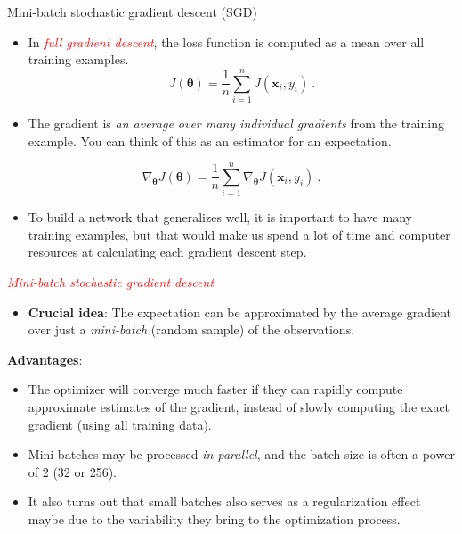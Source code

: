 \documentclass[10pt,ignorenonframetext,]{beamer}
\providecommand{\tightlist}{%
  \setlength{\itemsep}{0pt}\setlength{\parskip}{0pt}}
\begin{document}
\begin{frame}

\begin{block}{Mini-batch stochastic gradient descent (SGD)}

\vspace{2mm}

\begin{itemize}
\item
  In \emph{\textcolor{red}{full gradient descent}}, the loss function is
  computed as a mean over all training examples. \[
  J({\boldsymbol \theta})=\frac{1}{n}\sum_{i=1}^n J({\boldsymbol x}_i, y_i) \ .
  \]
\item
  The gradient is \emph{an average over many individual gradients} from
  the training example. You can think of this as an estimator for an
  expectation.
\end{itemize}

\[
\nabla_{\boldsymbol \theta} J({\boldsymbol \theta})=\frac{1}{n}\sum_{i=1}^n \nabla_{\boldsymbol \theta} J({\boldsymbol x}_i, y_i) \ .
\]

\begin{itemize}
\tightlist
\item
  To build a network that generalizes well, it is important to have many
  training examples, but that would make us spend a lot of time and
  computer resources at calculating each gradient descent step.
\end{itemize}

\end{block}

\end{frame}

\begin{frame}

\emph{\textcolor{red}{Mini-batch stochastic gradient descent}}

\vspace{2mm}

\begin{itemize}
\tightlist
\item
  \textbf{Crucial idea}: The expectation can be approximated by the
  average gradient over just a \emph{mini-batch} (random sample) of the
  observations.
\end{itemize}

\vspace{2mm}

\textbf{Advantages}:

\begin{itemize}
\item
  The optimizer will converge much faster if they can rapidly compute
  approximate estimates of the gradient, instead of slowly computing the
  exact gradient (using all training data).
\item
  Mini-batches may be processed \emph{in parallel}, and the batch size
  is often a power of 2 (32 or 256).
\item
  It also turns out that small batches also serves as a regularization
  effect maybe due to the variability they bring to the optimization
  process.
\end{itemize}

\end{frame}
\end{document}
